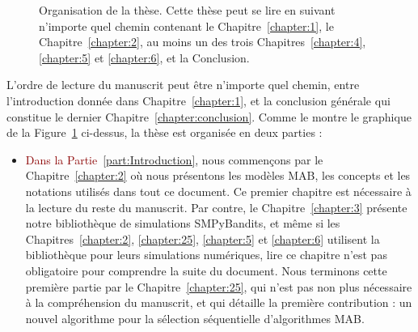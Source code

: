 \begin{resume_fr}
\begin{figure}[h!]
{
    }
    \caption[Organisation de la thèse : une carte de lecture.]{Organisation de la thèse. Cette thèse peut se lire en suivant n'importe quel chemin contenant le Chapitre~\ref{chapter:1}, le Chapitre~\ref{chapter:2}, au moins un des trois Chapitres~\ref{chapter:4}, \ref{chapter:5} et \ref{chapter:6}, et la Conclusion.}
    \label{fig:1:organization_fr}
\end{figure}

L'ordre de lecture du manuscrit peut être n'importe quel chemin, entre l'introduction donnée dans Chapitre~\ref{chapter:1}, et la conclusion générale qui constitue le dernier Chapitre~\ref{chapter:conclusion}.
Comme le montre le graphique de la Figure~\ref{fig:1:organization_fr} ci-dessus,
la thèse est organisée en deux parties :

\begin{itemize}
    \item
\textcolor{darkred}{Dans la Partie~\ref{part:Introduction}}, nous commençons par le Chapitre~\ref{chapter:2} où nous présentons les modèles MAB, les concepts et les notations utilisés dans tout ce document. Ce premier chapitre est nécessaire à la lecture du reste du manuscrit.
Par contre, le Chapitre~\ref{chapter:3} présente notre bibliothèque de simulations SMPyBandits, et même si les Chapitres~\ref{chapter:2}, \ref{chapter:25}, \ref{chapter:5} et \ref{chapter:6} utilisent la bibliothèque pour leurs simulations numériques, lire ce chapitre n'est pas obligatoire pour comprendre la suite du document.
Nous terminons cette première partie par le Chapitre~\ref{chapter:25}, qui n'est pas non plus nécessaire à la compréhension du manuscrit, et qui détaille la première contribution : un nouvel algorithme pour la sélection séquentielle d'algorithmes MAB.


\end{itemize}
\end{resume_fr}
